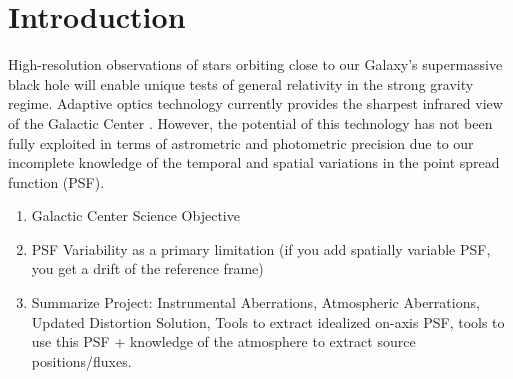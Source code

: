 \section{Introduction}

High-resolution observations of stars orbiting close to our Galaxy's supermassive black hole will enable unique tests of general relativity in the strong gravity regime. Adaptive optics technology currently provides the sharpest infrared view of the Galactic Center \cite{Ghez_2005}. However, the potential of this technology has not been fully exploited in terms of astrometric and photometric precision due to our incomplete knowledge of the temporal and spatial variations in the point spread function (PSF). 

\begin{enumerate}
\item Galactic Center Science Objective
\item PSF Variability as a primary limitation (if you add spatially variable PSF, you get a drift of the reference frame)
\item Summarize Project: Instrumental Aberrations, Atmospheric Aberrations, Updated Distortion Solution, Tools to extract idealized on-axis PSF, tools to use this PSF + knowledge of the atmosphere to extract source positions/fluxes.
\end{enumerate}



    
    
